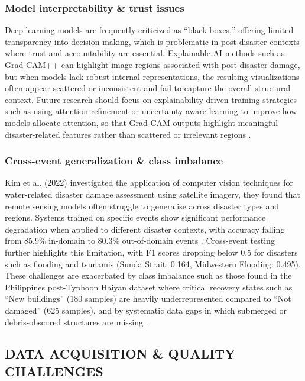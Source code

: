 \documentclass[conference,a4paper]{IEEEtran}
\begin{document}
\subsubsection{\textbf{Model interpretability \& trust issues}}
Deep learning models are frequently criticized as ``black boxes,'' offering limited transparency into decision-making, which is problematic in post-disaster contexts where trust and accountability are essential. Explainable AI methods such as Grad-CAM++ can highlight image regions associated with post-disaster damage, but when models lack robust internal representations, the resulting visualizations often appear scattered or inconsistent and fail to capture the overall structural context. Future research should focus on explainability-driven training strategies such as using attention refinement or uncertainty-aware learning to improve how models allocate attention, so that Grad-CAM outputs highlight meaningful disaster-related features rather than scattered or irrelevant regions \cite{lagapEnhancingPostDisasterDamage2025}.

\subsubsection{\textbf{Cross-event generalization \& class imbalance}}
Kim et al. (2022) investigated the application of computer vision techniques for water-related disaster damage assessment using satellite imagery, they found that remote sensing models often struggle to generalise across disaster types and regions. Systems trained on specific events show significant performance degradation when applied to different disaster contexts, with accuracy falling from 85.9\% in-domain to 80.3\% out-of-domain events \cite{kimDisasterAssessmentUsing2022}. Cross-event testing further highlights this limitation, with F1 scores dropping below 0.5 for disasters such as flooding and tsunamis (Sunda Strait: 0.164, Midwestern Flooding: 0.495). These challenges are exacerbated by class imbalance such as those found in the Philippines post-Typhoon Haiyan dataset where critical recovery states such as ``New buildings'' (180 samples) are heavily underrepresented compared to ``Not damaged'' (625 samples), and by systematic data gaps in which submerged or debris-obscured structures are missing \cite{lagapEnhancingPostDisasterDamage2025}.


\subsection{DATA ACQUISITION \& QUALITY CHALLENGES}
\end{document}

